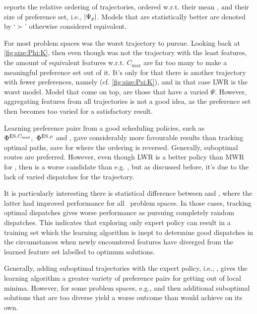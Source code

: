 reports the relative ordering of trajectories, 
ordered w.r.t. their mean \namerho, and their size of preference set, i.e., 
$\lvert\Psi_p\rvert$.
Models that are statistically better are denoted by `$\succ$' otherwise 
considered equivalent. 

For most problem spaces  was the worst trajectory to pursue. 
Looking back at \cref{fig:size:Phi:K}, then even though  was not 
the trajectory with the least features, the amount of equivalent features 
w.r.t. $C_{\max}$ are far too many to make a meaningful preference set out of 
it. It's only for  that there is another trajectory with fewer 
preferences, namely  (cf. \cref{fig:size:Psi:K}), and in that 
case LWR is the worst model.
Model that come on top, are those that have a varied $\Psi$. However, 
aggregating features from all trajectories is not a good idea, as the 
preference set then becomes too varied for a satisfactory result. 





Learning preference pairs from a good scheduling policies, such as 
$\Phi^{\text{ES}.{C_{\max}}},~\Phi^{\text{ES}.{\rho}}$ and , gave considerably more 
favourable results than tracking optimal paths, save for  where the 
ordering is reversed. Generally, suboptimal routes are preferred. 
However, even though LWR is a better policy than MWR for \FSP, then 
 is a worse candidate than e.g. , but as discussed 
before, it's due to the lack of varied dispatches for the trajectory.

It is particularly interesting there is statistical difference between 
 and , where the latter had improved performance for 
all \JSP\ problem spaces. In those cases, tracking optimal dispatches gives 
worse performance as pursuing completely random dispatches. 
This indicates that exploring only expert policy can result in a 
training set which the learning algorithm is inept to determine good dispatches 
in the circumstances when newly encountered features have diverged from the 
learned feature set labelled to optimum solutions. 

Generally, adding suboptimal trajectories with the expert policy, i.e., 
, gives the learning algorithm a greater variety of preference 
pairs for getting out of local minima. However, for some problem spaces, e.g., 
 and  then additional suboptimal solutions that are too 
diverse yield a worse outcome than  would achieve on its own.

